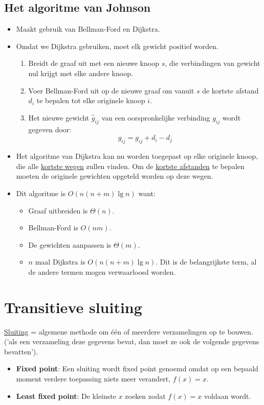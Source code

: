 \documentclass{report}
\begin{document}
\subsection{Het algoritme van Johnson}
\begin{itemize}
	\item[\info] Maakt gebruik van Bellman-Ford en Dijkstra.
	\item[\info] Omdat we Dijkstra gebruiken, moet elk gewicht positief worden. 
	\begin{enumerate}
		\item Breidt de graaf uit met een nieuwe knoop $s$, die verbindingen van gewicht nul krijgt met elke andere knoop.
		\item Voer Bellman-Ford uit op de nieuwe graaf om vanuit $s$ de kortste afstand $d_i$ te bepalen tot elke originele knoop $i$.
		\item Het nieuwe gewicht $\hat{g}_{ij}$ van een oorspronkelijke verbinding $g_{ij}$ wordt gegeven door: 
		$$\hat{g}_{ij} = g_{ij} + d_i - d_j$$ 
	\end{enumerate}
	\item[\info] Het algoritme van Dijkstra kan nu worden toegepast op elke originele knoop, die alle \underline{kortste wegen} zullen vinden. Om de \underline{kortste afstanden} te bepalen moeten de originele gewichten opgeteld worden op deze wegen.
	\item[\info] Dit algoritme is $O(n(n + m)\lg n)$ want:
	\begin{itemize}
		\item[\info] Graaf uitbreiden is $\Theta(n)$.
		\item[\info] Bellman-Ford is $O(nm)$.
		\item[\info] De gewichten aanpassen is $\Theta(m)$.
		\item[\alert] $n$ maal Dijkstra is $O(n(n + m)\lg n)$. Dit is de belangrijkste term, al de andere termen mogen verwaarloosd worden.
	\end{itemize}
\end{itemize}

\section{Transitieve sluiting}
\underline{Sluiting} = algemene methode om één of meerdere verzamelingen op te bouwen. ('als een verzameling deze gegevens bevat, dan moet ze ook de volgende gegevens bevatten').

\begin{itemize}
	\item[\info] \textbf{Fixed point}:  Een sluiting wordt fixed point genoemd omdat op een bepaald moment verdere toepassing niets meer verandert, $f(x) = x$.
	\item[\info] \textbf{Least fixed point}: De kleinste $x$ zoeken zodat $f(x) = x$ voldaan wordt.
\end{itemize}
\end{document}
